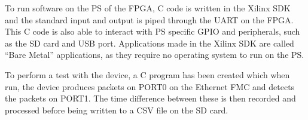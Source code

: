 To run software on the PS of the FPGA, C code is written in the Xilinx SDK and the standard input and output is 
piped through the UART on the FPGA. This C code is also able to interact with PS specific GPIO and peripherals, such 
as the SD card and USB port.  Applications made in the Xilinx SDK are called “Bare Metal” applications, as they 
require no operating system to run on the PS.

To perform a test with the device, a C program has been created which when run, the device produces packets on PORT0 
on the Ethernet FMC and detects the packets on PORT1. The time difference between these is then recorded and 
processed before being written to a CSV file on the SD card. 

%

%

%
